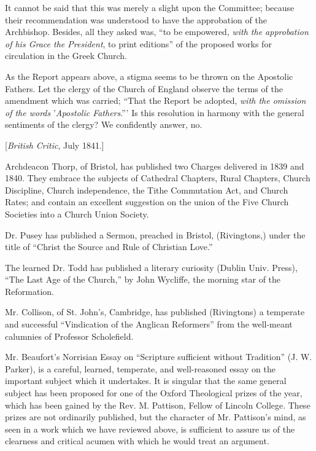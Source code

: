 It cannot be said that this was merely a slight
upon the Committee; because their recommendation was understood to have
the approbation of the Archbishop. Besides, all they asked was, ``to be
empowered, \emph{with the approbation of his Grace the President}, to
print editions'' of the proposed works for circulation in the Greek
Church.

As the Report appears above, a stigma seems to be
thrown on the Apostolic Fathers. Let the clergy of the Church of England
observe the terms of the amendment which was carried; ``That the Report
be adopted, \emph{with the omission of the words} '\emph{Apostolic Fathers}.'''
Is this resolution in harmony with the general sentiments of the clergy?
We confidently answer, no.


[\emph{British Critic}, July 1841.]

Archdeacon Thorp, of Bristol, has published
two Charges delivered in 1839 and 1840. They embrace the subjects of
Cathedral Chapters, Rural Chapters, Church Discipline, Church
independence, the Tithe Commutation Act, and Church Rates; and contain
an excellent suggestion on the union of the Five Church Societies into a
Church Union Society.

Dr. Pusey has published a Sermon, preached in
Bristol, (Rivingtons,) under the title of ``Christ the Source and Rule of
Christian Love.''

The learned Dr. Todd has published a literary
curiosity (Dublin Univ. Press), ``The Last Age of the Church,'' by John
Wycliffe, the morning star of the Reformation.

Mr. Collison, of St. John's, Cambridge, has
published (Rivingtons) a temperate and successful ``Vindication of the
Anglican Reformers'' from the well-meant calumnies of Professor
Scholefield.

Mr. Beaufort's Norrisian Essay on ``Scripture
sufficient without Tradition'' (J. W. Parker), is a careful, learned,
temperate, and well-reasoned essay on the important subject which it
undertakes. It is singular that the same general subject has been
proposed for one of the Oxford Theological prizes of the year, which has
been gained by the Rev. M. Pattison, Fellow of Lincoln College. These
prizes are not ordinarily published, but the character of Mr. Pattison's
mind, as seen in a work which we have reviewed above, is sufficient to
assure us of the clearness and critical acumen with which he would treat
an argument.

